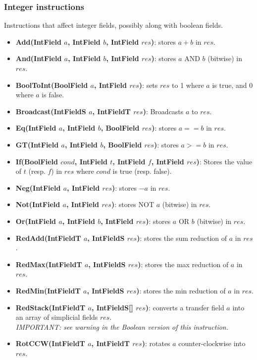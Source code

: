 \documentclass[11pt,a4paper]{report}
\begin{document}
\subsubsection{Integer instructions}
Instructions that affect integer fields, possibly along with boolean fields.
\begin{itemize}
    \item \textbf{Add(IntField $a$, IntField $b$, IntField $res$)}: stores $a + b$ in $res$.
    \item \textbf{And(IntField $a$, IntField $b$, IntField $res$)}: stores $a$ AND $b$ (bitwise) in $res$.
    \item \textbf{BoolToInt(BoolField $a$, IntField $res$)}: sets $res$ to 1 where $a$ is true, and 0 where $a$ is false.
    \item \textbf{Broadcast(IntFieldS $a$, IntFieldT $res$)}: Broadcasts $a$ to $res$.
    \item \textbf{Eq(IntField $a$, IntField $b$, BoolField $res$)}: stores $a == b$ in $res$.
    \item \textbf{GT(IntField $a$, IntField $b$, BoolField $res$)}: stores $a >= b$ in $res$.
    \item \textbf{If(BoolField $cond$, IntField $t$, IntField $f$, IntField $res$)}: Stores the value of $t$ (resp. $f$) in $res$ where $cond$ is true (resp. false).
    \item \textbf{Neg(IntField $a$, IntField $res$)}: stores $-a$ in $res$.
    \item \textbf{Not(IntField $a$, IntField $res$)}: stores NOT $a$ (bitwise) in $res$.
    \item \textbf{Or(IntField $a$, IntField $b$, IntField $res$)}: stores $a$ OR $b$ (bitwise) in $res$.
    \item \textbf{RedAdd(IntFieldT $a$, IntFieldS $res$)}: stores the sum reduction of $a$ in $res$.
    \item \textbf{RedMax(IntFieldT $a$, IntFieldS $res$)}: stores the max reduction of $a$ in $res$.
    \item \textbf{RedMin(IntFieldT $a$, IntFieldS $res$)}: stores the min reduction of $a$ in $res$.
    \item \textbf{RedStack(IntFieldT $a$, IntFieldS[] $res$)}: converts a transfer field $a$ into an array of simplicial fields $res$.\\
    \textit{IMPORTANT: see warning in the Boolean version of this instruction.}
    \item \textbf{RotCCW(IntFieldT $a$, IntFieldT $res$)}: rotates $a$ counter-clockwise into $res$.

\end{itemize}
\end{document}
